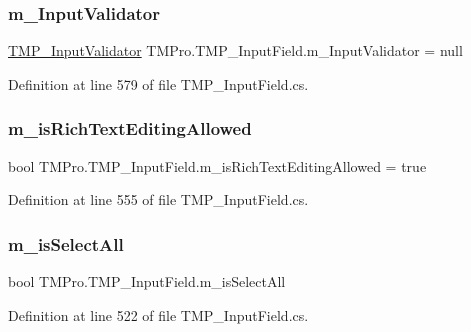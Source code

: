 \subsubsection{\texorpdfstring{m\_InputValidator}{m\_InputValidator}}
{\footnotesize\ttfamily \mbox{\hyperlink{class_t_m_pro_1_1_t_m_p___input_validator}{T\+M\+P\+\_\+\+Input\+Validator}} T\+M\+Pro.\+T\+M\+P\+\_\+\+Input\+Field.\+m\+\_\+\+Input\+Validator = null\hspace{0.3cm}{\ttfamily [protected]}}



Definition at line 579 of file T\+M\+P\+\_\+\+Input\+Field.\+cs.

\mbox{\label{class_t_m_pro_1_1_t_m_p___input_field_accb94749f5654852ae2edef1165a6f34}} 
\subsubsection{\texorpdfstring{m\_isRichTextEditingAllowed}{m\_isRichTextEditingAllowed}}
{\footnotesize\ttfamily bool T\+M\+Pro.\+T\+M\+P\+\_\+\+Input\+Field.\+m\+\_\+is\+Rich\+Text\+Editing\+Allowed = true\hspace{0.3cm}{\ttfamily [protected]}}



Definition at line 555 of file T\+M\+P\+\_\+\+Input\+Field.\+cs.

\mbox{\label{class_t_m_pro_1_1_t_m_p___input_field_a6d8562baedf249de6f7f6d12bc6c9a93}} 
\subsubsection{\texorpdfstring{m\_isSelectAll}{m\_isSelectAll}}
{\footnotesize\ttfamily bool T\+M\+Pro.\+T\+M\+P\+\_\+\+Input\+Field.\+m\+\_\+is\+Select\+All\hspace{0.3cm}{\ttfamily [protected]}}



Definition at line 522 of file T\+M\+P\+\_\+\+Input\+Field.\+cs.

